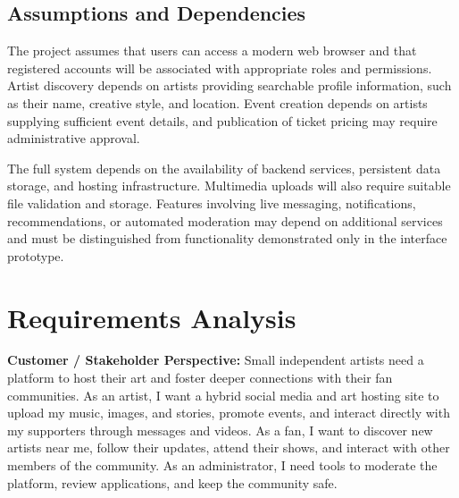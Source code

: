\documentclass[11pt]{report}
\begin{document}
\section{Assumptions and Dependencies}

The project assumes that users can access a modern web browser and that registered accounts will be associated with appropriate roles and permissions. Artist discovery depends on artists providing searchable profile information, such as their name, creative style, and location. Event creation depends on artists supplying sufficient event details, and publication of ticket pricing may require administrative approval.

The full system depends on the availability of backend services, persistent data storage, and hosting infrastructure. Multimedia uploads will also require suitable file validation and storage. Features involving live messaging, notifications, recommendations, or automated moderation may depend on additional services and must be distinguished from functionality demonstrated only in the interface prototype.

\chapter{Requirements Analysis}


\textbf{Customer / Stakeholder Perspective:}
Small independent artists need a platform to host their art and foster deeper connections with their fan communities. As an artist, I want a hybrid social media and art hosting site to upload my music, images, and stories, promote events, and interact directly with my supporters through messages and videos. As a fan, I want to discover new artists near me, follow their updates, attend their shows, and interact with other members of the community. As an administrator, I need tools to moderate the platform, review applications, and keep the community safe.
\end{document}

